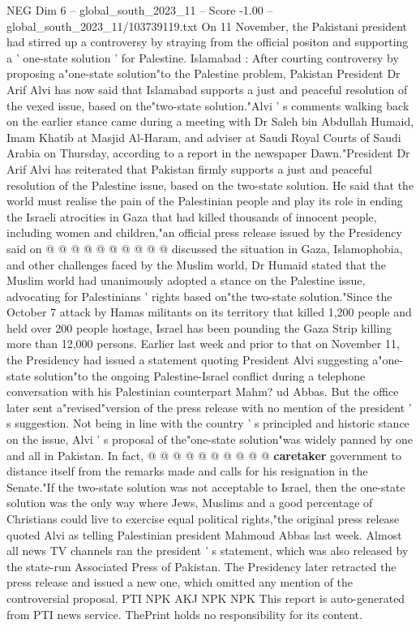 \begin{textsample}{NEG Dim 6 – global\_south\_2023\_11 – Score -1.00 – global\_south\_2023\_11/103739119.txt}  \label{ex:f6_neg_188}
On 11 November, the Pakistani president had stirred up a controversy by straying from the official positon and supporting a ' one-state solution ' for Palestine.
Islamabad : After courting controversy by proposing a"one-state solution"to the Palestine problem, Pakistan President Dr Arif Alvi has now said that Islamabad supports a just and peaceful resolution of the vexed issue, based on the"two-state solution."Alvi ' s comments walking back on the earlier stance came during a meeting with Dr Saleh bin Abdullah Humaid, Imam Khatib at Masjid Al-Haram, and adviser at Saudi Royal Courts of Saudi Arabia on Thursday, according to a report in the newspaper Dawn."President Dr Arif Alvi has reiterated that Pakistan firmly supports a just and peaceful resolution of the Palestine issue, based on the two-state solution.
He said that the world must realise the pain of the Palestinian people and play its role in ending the Israeli atrocities in Gaza that had killed thousands of innocent people, including women and children,"an official press release issued by the Presidency said on @ @ @ @ @ @ @ @ @ @ discussed the situation in Gaza, Islamophobia, and other challenges faced by the Muslim world, Dr Humaid stated that the Muslim world had unanimously adopted a stance on the Palestine issue, advocating for Palestinians ' rights based on"the two-state solution."Since the October 7 attack by Hamas militants on its territory that killed 1,200 people and held over 200 people hostage, Israel has been pounding the Gaza Strip killing more than 12,000 persons.
Earlier last week and prior to that on November 11, the Presidency had issued a statement quoting President Alvi suggesting a"one-state solution"to the ongoing Palestine-Israel conflict during a telephone conversation with his Palestinian counterpart Mahm? ud Abbas.
But the office later sent a"revised"version of the press release with no mention of the president ' s suggestion.
Not being in line with the country ' s principled and historic stance on the issue, Alvi ' s proposal of the"one-state solution"was widely panned by one and all in Pakistan.
In fact, @ @ @ @ @ @ @ @ @ @ \textbf{caretaker} government to distance itself from the remarks made and calls for his resignation in the Senate."If the two-state solution was not acceptable to Israel, then the one-state solution was the only way where Jews, Muslims and a good percentage of Christians could live to exercise equal political rights,"the original press release quoted Alvi as telling Palestinian president Mahmoud Abbas last week.
Almost all news TV channels ran the president ' s statement, which was also released by the state-run Associated Press of Pakistan.
The Presidency later retracted the press release and issued a new one, which omitted any mention of the controversial proposal.
PTI NPK AKJ NPK NPK This report is auto-generated from PTI news service.
ThePrint holds no responsibility for its content.

\end{textsample}
